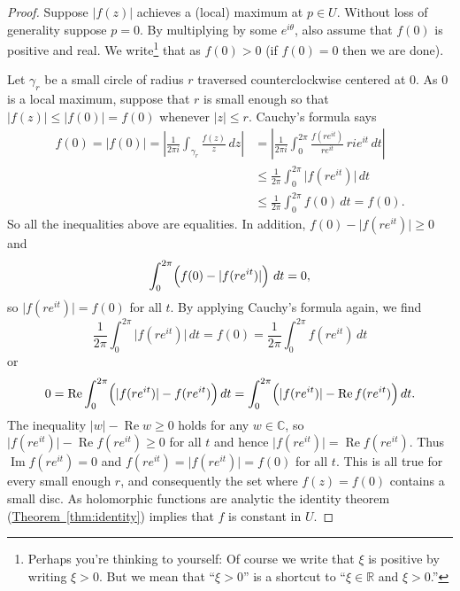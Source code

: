 \documentclass[12pt,openany]{book}
\renewcommand{\Re}{\operatorname{Re}}
\renewcommand{\Im}{\operatorname{Im}}
\newcommand{\sabs}[1]{\lvert {#1} \rvert}
\newcommand{\abs}[1]{\left\lvert {#1} \right\rvert}
\newcommand{\C}{{\mathbb{C}}}
\newcommand{\R}{{\mathbb{R}}}
\theoremstyle{plain}
\theoremstyle{remark}
\theoremstyle{definition}
\theoremstyle{exercise}
\theoremstyle{example}
\newcommand{\thmref}[1]{\hyperref[#1]{Theorem~\ref*{#1}}}
\begin{document}
\begin{proof}
Suppose $\sabs{f(z)}$ achieves a (local) maximum at $p \in U$.
Without loss of generality suppose $p = 0$.
By multiplying by some
$e^{i\theta}$, also assume that $f(0)$ is positive and real.
We write\footnote{%
Perhaps you're thinking to yourself: Of course we write that $\xi$ is
positive by writing $\xi > 0$.  But we mean that ``$\xi > 0$''
is a shortcut to ``$\xi \in \R$ and $\xi > 0$.''}
that as $f(0) > 0$ (if $f(0) = 0$ then we are done).

Let $\gamma_r$ be a small circle of radius $r$ traversed counterclockwise
centered at $0$.  As $0$ is a local maximum, suppose that $r$ is small enough
so that
$\sabs{f(z)} \leq \sabs{f(0)} = f(0)$ whenever $\sabs{z} \leq r$.
Cauchy's formula says
\begin{equation*}
\begin{split}
f(0) = \sabs{f(0)} =
\abs{\frac{1}{2\pi i}
\int_{\gamma_r}
\frac{f(z)}{z} \, dz
}
& =
\abs{
\frac{1}{2\pi i}
\int_0^{2\pi}
\frac{f(re^{it})}{re^{it}} \, ri e^{it} \, dt
}
\\
& \leq
\frac{1}{2\pi}
\int_0^{2\pi}
\sabs{f(re^{it})}\, dt
\\
&
\leq
\frac{1}{2\pi}
\int_0^{2\pi}
f(0)\, dt = f(0) .
\end{split}
\end{equation*}
So all the inequalities above are equalities.
In addition, $f(0)-\sabs{f(re^{it})} \geq 0$ and
\begin{equation*}
\int_0^{2\pi}\Bigl( f(0)-\sabs{f(re^{it})} \Bigr) \ dt = 0 ,
\end{equation*}
so $\sabs{f(re^{it})} = f(0)$ for all $t$.
By applying Cauchy's formula
again, we find
\begin{equation*}
\frac{1}{2\pi}
\int_0^{2\pi}
\sabs{f(re^{it})}\, dt
=
f(0)
=
\frac{1}{2\pi}
\int_0^{2\pi}
f(re^{it})\, dt
\end{equation*}
or
\begin{equation*}
0 =
\Re \int_0^{2\pi}
\Bigl(\sabs{f(re^{it})}-f(re^{it})\Bigr)\, dt
=
\int_0^{2\pi}
\Bigl(\sabs{f(re^{it})}-\Re f(re^{it})\Bigr)\, dt .
\end{equation*}
The inequality $\sabs{w} - \Re w \geq 0$ holds for any $w \in \C$,
so
$\sabs{f(re^{it})}-\Re f(re^{it}) \geq 0$ for all $t$ and hence
$\sabs{f(re^{it})}=\Re f(re^{it})$.  Thus $\Im f(re^{it}) = 0$
and 
$f(re^{it})=\sabs{f(re^{it})} = f(0)$ for all $t$.
This is all true for every small enough $r$, and consequently the set where
$f(z) = f(0)$ contains a small disc.  As holomorphic functions are analytic
the identity theorem (\thmref{thm:identity}) implies that $f$ is constant in
$U$.
\end{proof}
\end{document}
